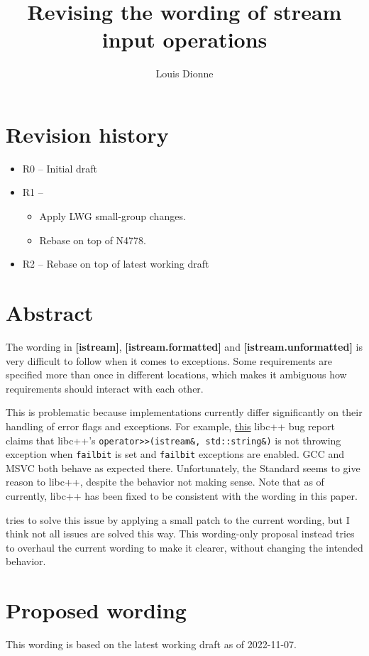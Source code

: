 \documentclass{wg21}
\title{Revising the wording of stream input operations}
\author{Louis Dionne}{ldionne@apple.com}
\newcommand{\cc}[1]{\texttt{#1}}
\begin{document}
\maketitle

\section{Revision history}
\begin{itemize}
  \item R0 -- Initial draft
  \item R1 -- \begin{itemize}
              \item Apply LWG small-group changes.
              \item Rebase on top of N4778.
              \end{itemize}
  \item R2 -- Rebase on top of latest working draft
\end{itemize}

\section{Abstract}
The wording in \textbf{[istream]}, \textbf{[istream.formatted]} and
\textbf{[istream.unformatted]} is very difficult to follow when it comes
to exceptions. Some requirements are specified more than once in different
locations, which makes it ambiguous how requirements should interact with
each other.

This is problematic because implementations currently differ significantly
on their handling of error flags and exceptions. For example,
\href{https://llvm.org/PR21586}{this} libc++ bug
report claims that libc++'s \break \cc{operator>>(istream&, std::string&)} is
not throwing exception when \cc{failbit} is set and \cc{failbit} exceptions
are enabled. GCC and MSVC both behave as expected there. Unfortunately, the
Standard seems to give reason to libc++, despite the behavior not making sense.
Note that as of currently, libc++ has been fixed to be consistent with the
wording in this paper.

\cite{LWG2349} tries to solve this issue by applying a small patch to the current
wording, but I think not all issues are solved this way. This wording-only
proposal instead tries to overhaul the current wording to make it clearer,
without changing the intended behavior.


\section{Proposed wording}
This wording is based on the latest working draft as of 2022-11-07.
\end{document}

